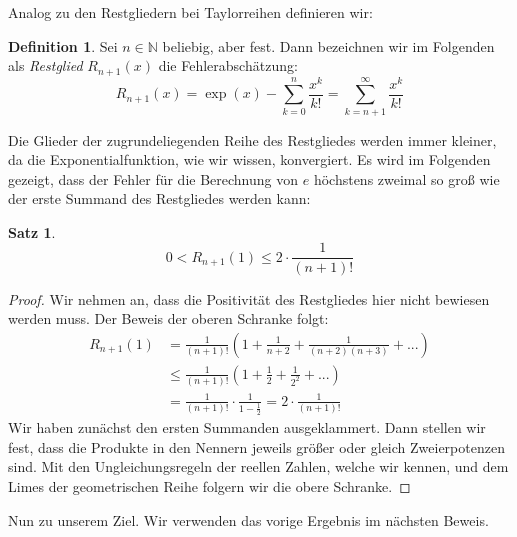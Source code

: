 \documentclass[10pt]{article}
\theoremstyle{definition}
\newtheorem{definition}{Definition}
\newtheorem{theorem}{Satz}
\theoremstyle{remark}
\begin{document}
 Analog zu den Restgliedern bei Taylorreihen definieren wir:
\begin{definition}
    Sei \(n \in \mathbb{N}\) beliebig, aber fest. Dann bezeichnen wir im Folgenden als \emph{Restglied} \(R_{n+1}(x)\) die Fehlerabschätzung:
    \[
        R_{n+1}(x) = \exp(x) - \sum_{k=0}^n \frac{x^k}{k!} = \sum_{k=n+1}^\infty \frac{x^k}{k!}
    \]
\end{definition}
Die Glieder der zugrundeliegenden Reihe des Restgliedes werden immer kleiner, da die Exponentialfunktion, wie wir wissen, konvergiert. Es wird im Folgenden gezeigt, dass der Fehler für die Berechnung von \(e\) höchstens zweimal so groß wie der erste Summand des Restgliedes werden kann:
\begin{theorem}
    \[0 < R_{n+1}(1) \leq 2 \cdot \frac{1}{(n+1)!}\]
\end{theorem}
\begin{proof}
    Wir nehmen an, dass die Positivität des Restgliedes hier nicht bewiesen werden muss. Der Beweis der oberen Schranke folgt:
    \begin{align*}
        R_{n+1}(1) &= \frac{1}{(n+1)!} \left(1+\frac{1}{n+2}+\frac{1}{(n+2)(n+3)}+...\right)\\
        &\leq \frac{1}{(n+1)!} \left(1+\frac{1}{2}+\frac{1}{2^2}+...\right)\\
        &= \frac{1}{(n+1)!} \cdot \frac{1}{1-\frac{1}{2}} = 2 \cdot \frac{1}{(n+1)!}
    \end{align*}
    Wir haben zunächst den ersten Summanden ausgeklammert. Dann stellen wir fest, dass die Produkte in den Nennern jeweils größer oder gleich Zweierpotenzen sind. Mit den Ungleichungsregeln der reellen Zahlen, welche wir kennen, und dem Limes der geometrischen Reihe folgern wir die obere Schranke.
\end{proof}

\newpage

Nun zu unserem Ziel. Wir verwenden das vorige Ergebnis im nächsten Beweis.
\end{document}
